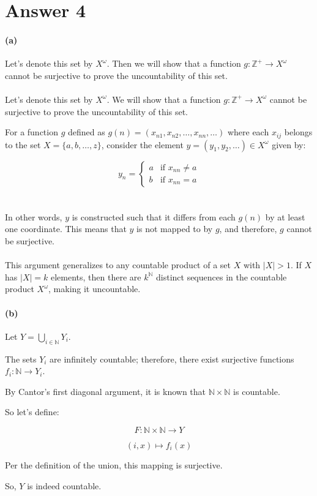 \documentclass[12pt]{article}
\begin{document}
\section*{Answer 4}
\paragraph{(a)}
Let's denote this set by \(X^{\omega}\). Then we will show that a function \(g : \mathbb{Z}^+ \rightarrow X^{\omega}\) cannot be surjective
to prove the uncountability of this set.
\\ \\
Let's denote this set by \(X^\omega\). We will show that a function \(g:\mathbb{Z}^+ \rightarrow X^\omega\) cannot be surjective to prove the uncountability of this set.

For a function \(g\) defined as \(g(n) = (x_{n1}, x_{n2}, \ldots, x_{nn}, \ldots)\) where each \(x_{ij}\) belongs to the set \(X = \{a, b, \ldots, z\}\), consider the element \(y = (y_1, y_2, \ldots) \in X^\omega\) given by:

\[
y_n = 
\begin{cases}
    a & \text{if } x_{nn} \neq a \\
    b & \text{if } x_{nn} = a
\end{cases}
\]
\\ \\
In other words, \(y\) is constructed such that it differs from each \(g(n)\) by at least one coordinate. This means that \(y\) is not mapped to by \(g\), and therefore, \(g\) cannot be surjective.
\\ \\
This argument generalizes to any countable product of a set \(X\) with \(\lvert X \rvert > 1\). If \(X\) has \(\lvert X \rvert = k\) elements, then there are \(k^{\mathbb{N}}\) distinct sequences in the countable product \(X^\omega\), making it uncountable.



\paragraph{(b)}
Let \(Y = \bigcup_{i \in \mathbb{N}} Y_i\).

The sets \(Y_i\) are infinitely countable; therefore, there exist surjective functions \(f_i: \mathbb{N} \rightarrow Y_i\).

By Cantor's first diagonal argument, it is known that \(\mathbb{N} \times \mathbb{N}\) is countable.

So let's define:

\[ F: \mathbb{N} \times \mathbb{N} \rightarrow Y \]

\[ (i, x) \mapsto f_i(x) \]

Per the definition of the union, this mapping is surjective.

So, \(Y\) is indeed countable.
\end{document}
